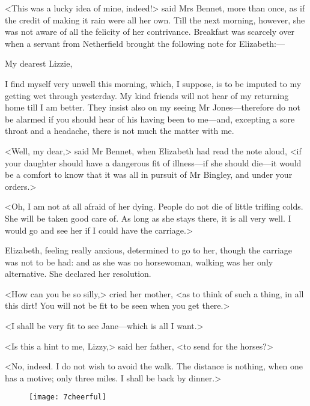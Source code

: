 <This was a lucky idea of mine, indeed!> said Mrs Bennet, more than once, as if the credit of making it rain were all her own. Till the next morning, however, she was not aware of all the felicity of her contrivance. Breakfast was scarcely over when a servant from Netherfield brought the following note for Elizabeth:—

\begin{mail}{}{My dearest Lizzie,}

I find myself very unwell this morning, which, I suppose, is to be imputed to my getting wet through yesterday. My kind friends will not hear of my returning home till I am better. They insist also on my seeing Mr Jones—therefore do not be alarmed if you should hear of his having been to me—and, excepting a sore throat and a headache, there is not much the matter with me.\\

\end{mail}

<Well, my dear,> said Mr Bennet, when Elizabeth had read the note aloud, <if your daughter should have a dangerous fit of illness—if she should die—it would be a comfort to know that it was all in pursuit of Mr Bingley, and under your orders.>

<Oh, I am not at all afraid of her dying. People do not die of little trifling colds. She will be taken good care of. As long as she stays there, it is all very well. I would go and see her if I could have the carriage.>

Elizabeth, feeling really anxious, determined to go to her, though the carriage was not to be had: and as she was no horsewoman, walking was her only alternative. She declared her resolution.

<How can you be so silly,> cried her mother, <as to think of such a thing, in all this dirt! You will not be fit to be seen when you get there.>

<I shall be very fit to see Jane—which is all I want.>

<Is this a hint to me, Lizzy,> said her father, <to send for the horses?>

<No, indeed. I do not wish to avoid the walk. The distance is nothing, when one has a motive; only three miles. I shall be back by dinner.>

\begin{letter}
	\begin{figure}[tbh]
	\centering
	\texttt{[image: 7cheerful]}
	\end{figure}
\end{letter}

